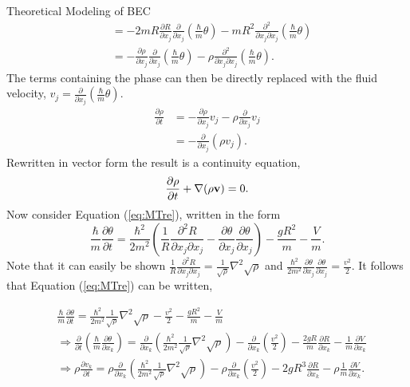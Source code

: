 \begin{chapter}{\label{cha:theoretical_model}Theoretical Modeling of BEC}
\begin{align*}
		&= -2mR\frac{\partial R}{\partial x_j}\frac{\partial}{\partial x_j}\left( \frac{\hbar}{m} \theta \right) - mR^2 \frac{\partial^2}{\partial x_j \partial x_j}\left(\frac{\hbar}{m}\theta \right)\\
		&= -\frac{\partial \rho}{\partial x_j}\frac{\partial}{\partial x_j}\left( \frac{\hbar}{m} \theta \right) - \rho \frac{\partial^2}{\partial x_j \partial x_j}\left(\frac{\hbar}{m}\theta \right).
	\end{align*}
	The terms containing the phase can then be directly replaced with the fluid velocity, $v_j = \frac{\partial}{\partial x_j}\left( \frac{\hbar}{m} \theta \right)$.
	\begin{align*}
		\frac{\partial \rho}{\partial t} &= -\frac{\partial \rho}{\partial x_j} v_j - \rho \frac{\partial}{\partial x_j} v_j\\
										 &= -\frac{\partial}{\partial x_j} \left( \rho v_j \right).
	\end{align*}
	Rewritten in vector form the result is a continuity equation,
	\begin{equation}
		\frac{\partial \rho}{\partial t} + \nabla(\rho{\bf v}) = 0.
		\label{eq:MTcont}
	\end{equation}
	Now consider Equation (\ref{eq:MTre}), written in the form
	\begin{equation*}
	\frac{\hbar}{m} \frac{\partial \theta}{\partial t} = \frac{\hbar^2}{2m^2} \left( \frac{1}{R} \frac{\partial^2 R}{\partial x_j \partial x_j} - \frac{\partial \theta}{\partial x_j}\frac{\partial \theta}{\partial x_j}  \right) - \frac{gR^2}{m} - \frac{V}{m}.
	\end{equation*}
	Note that it can easily be shown $\frac{1}{R} \frac{\partial^2 R}{\partial x_j \partial x_j} = \frac{1}{\sqrt{\rho}}\nabla^2\sqrt{\rho}$ and $\frac{\hbar^2}{2m^2} \frac{\partial \theta}{\partial x_j}\frac{\partial \theta}{\partial x_j} = \frac{v^2}{2} $. It follows that Equation (\ref{eq:MTre}) can be written,

	\begin{align*}
	&\frac{\hbar}{m} \frac{\partial \theta}{\partial t} = \frac{\hbar^2}{2m^2} \frac{1}{\sqrt{\rho}} \nabla^2\sqrt{\rho} - \frac{v^2}{2} - \frac{gR^2}{m} - \frac{V}{m}\\
	&\Rightarrow \frac{\partial}{\partial t}\left(\frac{\hbar}{m} \frac{\partial \theta}{\partial x_k}\right) = \frac{\partial}{\partial x_k}\left(\frac{\hbar^2}{2m^2} \frac{1}{\sqrt{\rho}} \nabla^2\sqrt{\rho} \right)- \frac{\partial}{\partial x_k} \left (\frac{v^2}{2}\right) - \frac{2gR}{m}\frac{\partial R}{\partial x_k} - \frac{1}{m}\frac{\partial V}{\partial x_k}\\
	&\Rightarrow \rho\frac{\partial v_k}{\partial t} =\rho \frac{\partial}{\partial x_k}\left(\frac{\hbar^2}{2m^2} \frac{1}{\sqrt{\rho}} \nabla^2\sqrt{\rho} \right)- \rho\frac{\partial}{\partial x_k} \left (\frac{v^2}{2}\right) - 2gR^3\frac{\partial R}{\partial x_k} - \rho\frac{1}{m}\frac{\partial V}{\partial x_k}.
	\end{align*}


\end{chapter}

